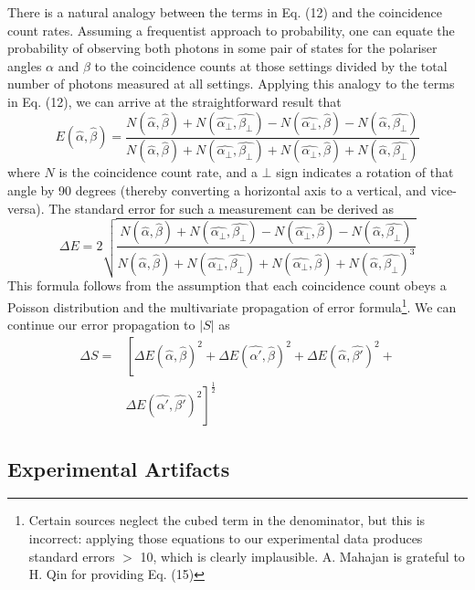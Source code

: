\documentclass[aps,prl,nofootinbib,twocolumn,superscriptaddress,groupedaddress]{revtex4}  %
\begin{document}
There is a natural analogy between the terms in Eq. (12) and the coincidence count rates. Assuming a frequentist approach to probability, one can equate the probability of observing both photons in some pair of states for the polariser angles $\alpha$ and $\beta$ to the coincidence counts at those settings divided by the total number of photons measured at all settings. Applying this analogy to the terms in Eq. (12), we can arrive at the straightforward result that 
\begin{equation}
E(\hat{\alpha},\hat{\beta}) = \dfrac{N(\hat{\alpha},\hat{\beta}) + N(\hat{\alpha_{\bot}},\hat{\beta_{\bot}}) - N(\hat{\alpha_{\bot}},\hat{\beta}) - N(\hat{\alpha},\hat{\beta_{\bot}})}{N(\hat{\alpha},\hat{\beta}) + N(\hat{\alpha_{\bot}},\hat{\beta_{\bot}}) + N(\hat{\alpha_{\bot}},\hat{\beta}) + N(\hat{\alpha},\hat{\beta_{\bot}})}
\end{equation}
where $N$ is the coincidence count rate, and a $\bot$ sign indicates a rotation of that angle by 90 degrees (thereby converting a horizontal axis to a vertical, and vice-versa). The standard error for such a measurement can be derived as 
\begin{equation}
\Delta E = 2\sqrt{\dfrac{N(\hat{\alpha},\hat{\beta}) + N(\hat{\alpha_{\bot}},\hat{\beta_{\bot}}) - N(\hat{\alpha_{\bot}},\hat{\beta}) - N(\hat{\alpha},\hat{\beta_{\bot}})}{N(\hat{\alpha},\hat{\beta}) + N(\hat{\alpha_{\bot}},\hat{\beta_{\bot}}) + N(\hat{\alpha_{\bot}},\hat{\beta}) + N(\hat{\alpha},\hat{\beta_{\bot}})^{3}}}
\end{equation}
This formula follows from the assumption that each coincidence count obeys a Poisson distribution and the multivariate propagation of error formula\footnote{Certain sources\cite{qued} neglect the cubed term in the denominator, but this is incorrect: applying those equations to our experimental data produces standard errors $>$ 10, which is clearly implausible. A. Mahajan is grateful to H. Qin for providing Eq. (15)}. We can continue our error propagation to $|S|$ as
\begin{align}
\Delta S = & \left[\Delta E(\hat{\alpha},\hat{\beta})^{2} + \Delta E(\hat{\alpha'},\hat{\beta})^{2} + \Delta E(\hat{\alpha},\hat{\beta'})^{2} + \right. \nonumber \\
& \left . \Delta E(\hat{\alpha'},\hat{\beta'})^{2}\right]^{\frac{1}{2}}
\end{align}

\subsection{Experimental Artifacts}
\end{document}
